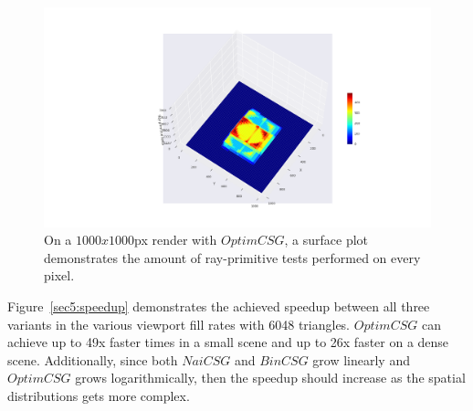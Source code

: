 \documentclass[a4paper,11pt,oneside]{article}
\begin{document}
\begin{figure}[H]
	\centering
	\includegraphics[width=\textwidth]{section5/plots/surface_optim_union.png}
	\caption{On a $1000x1000$px render with $OptimCSG$, a surface plot demonstrates the amount of ray-primitive tests performed on every pixel.}
	\label{sec5.1:test_count_optim}
\end{figure}

Figure~\ref{sec5:speedup} demonstrates the achieved speedup between all three variants in the various viewport fill rates with 6048 triangles. $OptimCSG$ can achieve up to 49x faster times in a small scene and up to 26x faster on a dense scene. Additionally, since both $NaiCSG$ and $BinCSG$ grow linearly and $OptimCSG$ grows logarithmically, then the speedup should increase as the spatial distributions gets more complex.
\end{document}
